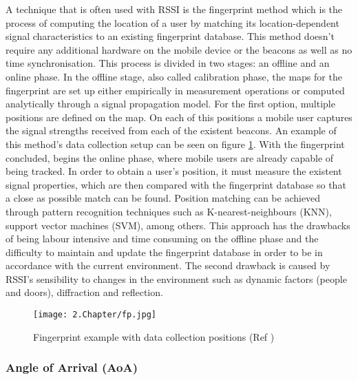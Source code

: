  
A technique that is often used with \ac{RSSI} is the fingerprint method which is the process of computing the location of a user by matching its location-dependent signal characteristics to an existing fingerprint database. This method doesn't require any additional hardware on the mobile device or the beacons as well as no time synchronisation. This process is divided in two stages: an offline and an online phase. In the offline stage, also called calibration phase, the maps for the fingerprint are set up either empirically in measurement operations or computed analytically through a signal propagation model. For the first option, multiple positions are defined on the map. On each of this positions a mobile user captures the signal strengths received from each of the existent beacons. An example of this method's data collection setup can be seen on figure \ref{fig:fp}. With the fingerprint concluded, begins the online phase, where mobile users are already capable of being tracked. In order to obtain a user's position, it must measure the existent signal properties, which are then compared with the fingerprint database so that a close as possible match can be found. Position matching can be achieved through pattern recognition techniques such as K-nearest-neighbours (KNN), support vector machines (SVM), among others. 
This approach has the drawbacks of being labour intensive and time consuming on the offline phase and the difficulty to maintain and update the fingerprint database in order to be in accordance with the current environment. The second drawback is caused by \ac{RSSI}'s sensibility to changes in the environment such as dynamic factors (people and doors), diffraction and reflection.  
 
\begin{figure}[H] 
\centering 
\texttt{[image: 2.Chapter/fp.jpg]} 
\caption[Fingerprint example with data collection positions (Ref \cite{fingerprint}) ]{ Fingerprint example with data collection positions (Ref \cite{fingerprint}) } 
\label{fig:fp} 
\end{figure} 
 
 
\subsubsection{Angle of Arrival (AoA) } 
\label{subsubsec:aoa} 
 
